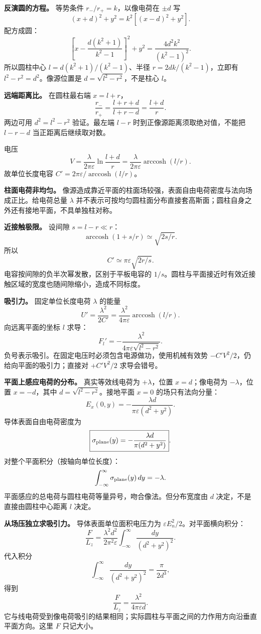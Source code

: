 \documentclass[12pt,a4paper,UTF8]{ctexart}
\begin{document}
\textbf{反演圆的方程。} 等势条件 \(r_-/r_+=k\)，以像电荷在 \(\pm d\) 写
\[
(x+d)^2+y^2=k^2[(x-d)^2+y^2].
\] 配方成圆： \[
\left[x-\frac{d(k^2+1)}{k^2-1}\right]^2+y^2
=\frac{4d^2k^2}{(k^2-1)^2}.
\] 所以圆柱中心 \(l=d(k^2+1)/(k^2-1)\)、半径 \(r=2dk/(k^2-1)\)，立即有
\(l^2-r^2=d^2\)。像源位置是 \(d=\sqrt{l^2-r^2}\)，不是柱心 \(l\)。

\textbf{远端距离比。} 在圆柱最右端 \(x=l+r\)， \[
\frac{r_-}{r_+}=\frac{l+r+d}{l+r-d}
=\frac{l+d}{r}.
\] 两边可用 \(d^2=l^2-r^2\) 验证。最左端 \(l-r\)
时到正像源距离须取绝对值，不能把 \(l-r-d\) 当正距离后继续取对数。

电压 \[
V=\frac{\lambda}{2\pi\varepsilon}\ln\frac{l+d}{r}
=\frac{\lambda}{2\pi\varepsilon}\operatorname{arccosh}(l/r).
\] 故单位长度电容 \(C'=2\pi\varepsilon/\operatorname{arccosh}(l/r)\)。

\textbf{柱面电荷非均匀。}
像源造成靠近平面的柱面场较强，表面自由电荷密度与法向场成正比。给电荷总量
\(\lambda\)
并不表示可按均匀圆柱面分布直接套高斯面；圆柱自身之外还有接地平面，不具单独柱对称。

\textbf{近接触极限。} 设间隙 \(s=l-r\ll r\)： \[
\operatorname{arccosh}(1+s/r)\simeq\sqrt{2s/r}.
\] 所以 \[
\boxed{C'\simeq\pi\varepsilon\sqrt{2r/s}}.
\] 电容按间隙的负半次幂发散，区别于平板电容的
\(1/s\)。圆柱与平面接近时有效近接触区域的宽度也随间隙缩小，造成不同标度。

\textbf{吸引力。} 固定单位长度电荷 \(\lambda\) 的能量 \[
U'=\frac{\lambda^2}{2C'}
=\frac{\lambda^2}{4\pi\varepsilon}\operatorname{arccosh}(l/r).
\] 向远离平面的坐标 \(l\) 求导： \[
\boxed{F_l'=-\frac{\lambda^2}{4\pi\varepsilon\sqrt{l^2-r^2}}}.
\] 负号表示吸引。在固定电压时必须包含电源做功，使用机械有效势
\(-C'V^2/2\)，仍给向平面的吸引力；直接对 \(+C'V^2/2\) 求导会错号。

\textbf{平面上感应电荷的分布。} 真实等效线电荷为 \(+\lambda\)，位置
\(x=d\)；像电荷为 \(-\lambda\)，位置 \(x=-d\)，其中
\(d=\sqrt{l^2-r^2}\)。接地平面 \(x=0\) 的场只有法向分量： \[
E_x(0,y)=-\frac{\lambda d}{\pi\varepsilon(d^2+y^2)}.
\] 导体表面自由电荷密度为 \[
\boxed{\sigma_{\rm plane}(y)=
-\frac{\lambda d}{\pi(d^2+y^2)}}.
\] 对整个平面积分（按轴向单位长度）： \[
\int_{-\infty}^{\infty}\sigma_{\rm plane}(y)\,dy=-\lambda.
\] 平面感应的总电荷与圆柱电荷等量异号，吻合像法。但分布宽度由 \(d\)
决定，不是直接由圆柱中心距离 \(l\) 决定。

\textbf{从场压独立求吸引力。} 导体表面单位面积电压力为
\(\varepsilon E_n^2/2\)。对平面横向积分： \[
\frac{F}{L_z}=
\frac{\lambda^2d^2}{2\pi^2\varepsilon}
\int_{-\infty}^{\infty}\frac{dy}{(d^2+y^2)^2}.
\] 代入积分 \[
\int_{-\infty}^{\infty}\frac{dy}{(d^2+y^2)^2}
=\frac{\pi}{2d^3},
\] 得到 \[
\boxed{\frac{F}{L_z}=\frac{\lambda^2}{4\pi\varepsilon d}}.
\]
它与线电荷受到像电荷吸引的结果相同；实际圆柱与平面之间的力作用方向沿垂直平面方向。这里
\(F\) 只记大小。
\end{document}
